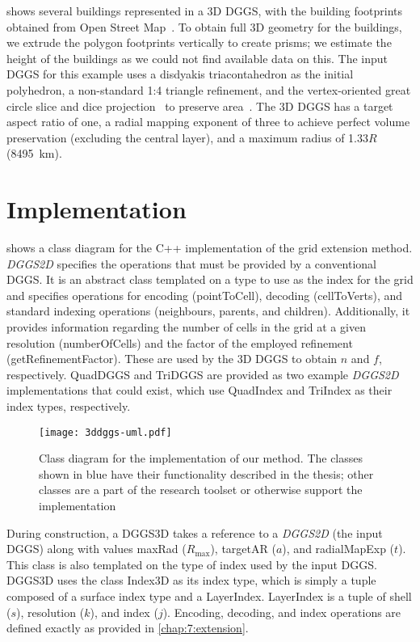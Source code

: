  shows several buildings represented in a 3D DGGS, with the building footprints obtained from Open Street Map~\cite{osm}.
To obtain full 3D geometry for the buildings, we extrude the polygon footprints vertically to create prisms; we estimate the height of the buildings as we could not find available data on this.
The input DGGS for this example uses a disdyakis triacontahedron as the initial polyhedron, a non-standard 1:4 triangle refinement, and the vertex-oriented great circle slice and dice projection~\cite{van2006slice} to preserve area~\cite{hall2020disdyakis}.
The 3D DGGS has a target aspect ratio of one, a radial mapping exponent of three to achieve perfect volume preservation (excluding the central layer), and a maximum radius of 1.33$R$ (8495~km).


\section{Implementation} \label{chap:8:impl}
 shows a class diagram for the C++ implementation of the grid extension method.
\textit{DGGS2D} specifies the operations that must be provided by a conventional DGGS.
It is an abstract class templated on a type to use as the index for the grid and specifies operations for encoding (pointToCell), decoding (cellToVerts), and standard indexing operations (neighbours, parents, and children).
Additionally, it provides information regarding the number of cells in the grid at a given resolution (numberOfCells) and the factor of the employed refinement (getRefinementFactor).
These are used by the 3D DGGS to obtain $n$ and $f$, respectively. QuadDGGS and TriDGGS are provided as two example \textit{DGGS2D} implementations that could exist, which use QuadIndex and TriIndex as their index types, respectively.


\begin{figure}[ht!]
	\centering
	\texttt{[image: 3ddggs-uml.pdf]}
	\caption[Class diagram of the grid extension implementation]{
		Class diagram for the implementation of our method. The classes shown in blue have their functionality described in the thesis; other classes are a part of the research toolset or otherwise support the implementation
	}
	\label{fig:uml}
\end{figure}


During construction, a DGGS3D takes a reference to a \textit{DGGS2D} (the input DGGS) along with values maxRad ($R_\mathrm{max}$), targetAR ($a$), and radialMapExp ($t$).
This class is also templated on the type of index used by the input DGGS. DGGS3D uses the class Index3D as its index type, which is simply a tuple composed of a surface index type and a LayerIndex.
LayerIndex is a tuple of shell ($s$), resolution ($k$), and index ($j$).
Encoding, decoding, and index operations are defined exactly as provided in \cref{chap:7:extension}.



